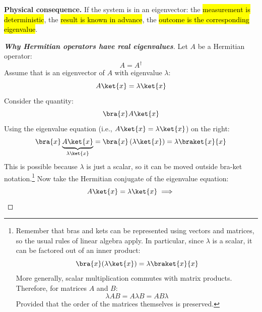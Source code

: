 \begin{enumerate}
\begin{remarkbox}
        \highspace
        \textcolor{Green3}{ \textbf{Physical consequence.}} If the system is in an eigenvector: the \hl{measurement is deterministic}, the \hl{result is known in advance}, the \hl{outcome is the corresponding eigenvalue}.
    \end{remarkbox}
    \begin{proof}[\textbf{Why Hermitian operators have real eigenvalues}]
        Let $A$ be a Hermitian operator:
        \begin{equation*}
            A = A^\dagger
        \end{equation*}
        Assume that  is an eigenvector of $A$ with eigenvalue $\lambda$:
        \begin{equation*}
            A\ket{x} = \lambda \ket{x}
        \end{equation*}
        Consider the quantity:
        \begin{equation*}
            \bra{x}A\ket{x}
        \end{equation*}
        Using the eigenvalue equation (i.e., $A\ket{x} = \lambda \ket{x}$) on the right:
        \begin{equation*}
            \bra{x}\underbrace{A\ket{x}}_{\lambda \ket{x}}
            =
            \bra{x}\left(\lambda \ket{x}\right)
            =
            \lambda \braket{x}{x}
        \end{equation*}
        This is possible because $\lambda$ is just a scalar, so it can be moved outside bra-ket notation.\footnote{
            Remember that bras and kets can be represented using vectors and matrices, so the usual rules of linear algebra apply. In particular, since $\lambda$ is a scalar, it can be factored out of an inner product:
            \begin{equation*}
                \bra{x}(\lambda \ket{x})
                =
                \lambda \braket{x}{x}
            \end{equation*}
            More generally, scalar multiplication commutes with matrix products. Therefore, for matrices $A$ and $B$:
            \begin{equation*}
                \lambda AB = A\lambda B = AB\lambda
            \end{equation*}
            Provided that the order of the matrices themselves is preserved.
        }
        Now take the Hermitian conjugate of the eigenvalue equation:
        \begin{equation*}
            A\ket{x} = \lambda \ket{x}
            \implies

\end{equation*}
\end{proof}
\end{enumerate}

